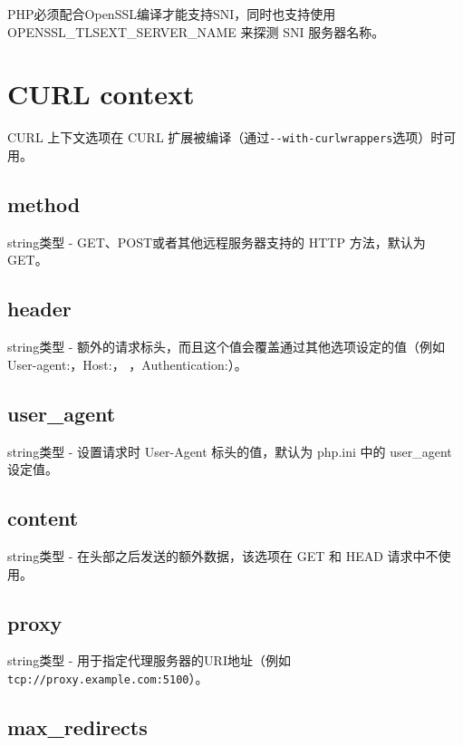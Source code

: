 PHP必须配合OpenSSL编译才能支持SNI，同时也支持使用 OPENSSL\_TLSEXT\_SERVER\_NAME 来探测 SNI 服务器名称。











\section{CURL context}

CURL 上下文选项在 CURL 扩展被编译（通过\texttt{-\/-with-curlwrappers}选项）时可用。


\subsection{method}

string类型 - GET、POST或者其他远程服务器支持的 HTTP 方法，默认为GET。



\subsection{header}

string类型 - 额外的请求标头，而且这个值会覆盖通过其他选项设定的值（例如User-agent:，Host:， ，Authentication:）。


\subsection{user\_agent}

string类型 - 设置请求时 User-Agent 标头的值，默认为 php.ini 中的 user\_agent 设定值。


\subsection{content}

string类型 - 在头部之后发送的额外数据，该选项在 GET 和 HEAD 请求中不使用。

\subsection{proxy}

string类型 - 用于指定代理服务器的URI地址（例如\texttt{tcp://proxy.example.com:5100}）。

\subsection{max\_redirects}

